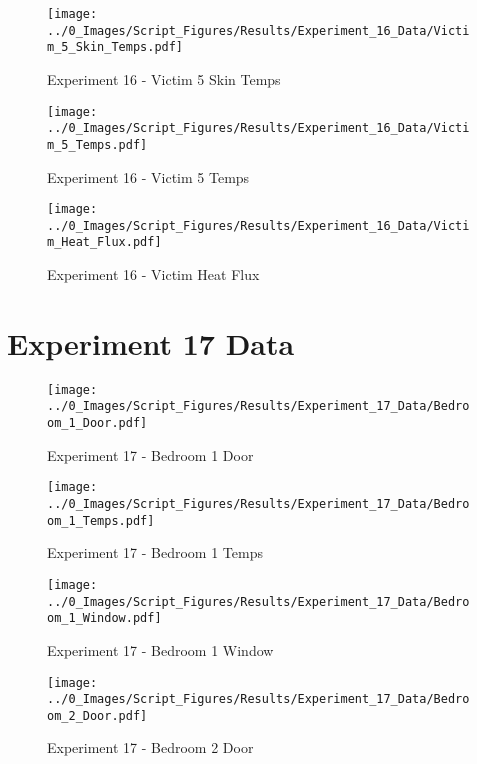 	\begin{figure}[H]
		\centering
		\texttt{[image: ../0\_Images/Script\_Figures/Results/Experiment\_16\_Data/Victim\_5\_Skin\_Temps.pdf]}
		\caption[]{Experiment 16 - Victim 5 Skin Temps}
	\end{figure}
 
	\clearpage

	\begin{figure}[H]
		\centering
		\texttt{[image: ../0\_Images/Script\_Figures/Results/Experiment\_16\_Data/Victim\_5\_Temps.pdf]}
		\caption[]{Experiment 16 - Victim 5 Temps}
	\end{figure}
 

	\begin{figure}[H]
		\centering
		\texttt{[image: ../0\_Images/Script\_Figures/Results/Experiment\_16\_Data/Victim\_Heat\_Flux.pdf]}
		\caption[]{Experiment 16 - Victim Heat Flux}
	\end{figure}
 
	\clearpage

\clearpage		\large
\section{Experiment 17 Data} \label{App:Exp17Results} 

	\begin{figure}[H]
		\centering
		\texttt{[image: ../0\_Images/Script\_Figures/Results/Experiment\_17\_Data/Bedroom\_1\_Door.pdf]}
		\caption[]{Experiment 17 - Bedroom 1 Door}
	\end{figure}
 

	\begin{figure}[H]
		\centering
		\texttt{[image: ../0\_Images/Script\_Figures/Results/Experiment\_17\_Data/Bedroom\_1\_Temps.pdf]}
		\caption[]{Experiment 17 - Bedroom 1 Temps}
	\end{figure}
 
	\clearpage

	\begin{figure}[H]
		\centering
		\texttt{[image: ../0\_Images/Script\_Figures/Results/Experiment\_17\_Data/Bedroom\_1\_Window.pdf]}
		\caption[]{Experiment 17 - Bedroom 1 Window}
	\end{figure}
 

	\begin{figure}[H]
		\centering
		\texttt{[image: ../0\_Images/Script\_Figures/Results/Experiment\_17\_Data/Bedroom\_2\_Door.pdf]}
		\caption[]{Experiment 17 - Bedroom 2 Door}
	\end{figure}
 
